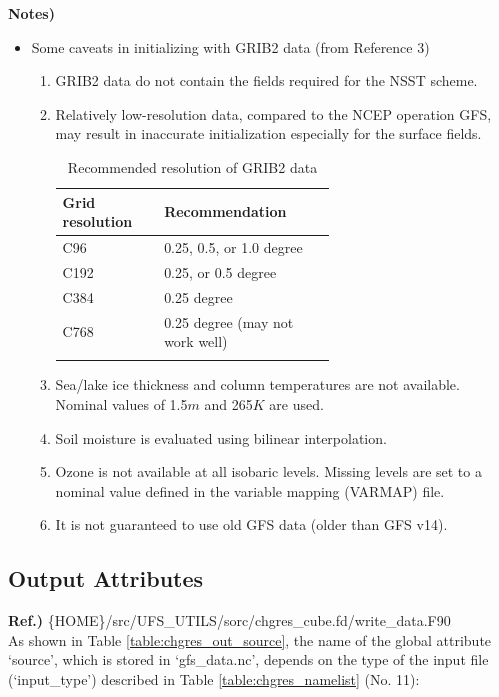 \documentclass[11pt,fleqn]{report}              %
\begin{document}
{\bf Notes)}
\begin{itemize}

\item Some caveats in initializing with GRIB2 data (from Reference 3)

\begin{enumerate}
\item GRIB2 data do not contain the fields required for the NSST scheme.
\item Relatively low-resolution data, compared to the NCEP operation GFS, may result in inaccurate initialization especially for the surface fields.
{
\fontsize{10}{12}\selectfont
\begin{longtable}{p{0.2\linewidth} | p{0.4\linewidth} }
\hline
\hline
Grid resolution & Recommendation \\
\hline
 C96 & 0.25, 0.5, or 1.0 degree \\
 C192 & 0.25, or 0.5 degree \\
 C384 & 0.25 degree \\
 C768 & 0.25 degree (may not work well) \\
\hline
\caption{Recommended resolution of GRIB2 data }
\label{table:chgres_init_grib2_recomm}
\end{longtable}
}

\item Sea/lake ice thickness and column temperatures are not available. Nominal values of 1.5$m$ and 265$K$ are used.
\item Soil moisture is evaluated using bilinear interpolation.
\item Ozone is not available at all isobaric levels. Missing levels are set to a nominal value defined in the variable mapping (VARMAP) file.
\item It is not guaranteed to use old GFS data (older than GFS v14).
\end{enumerate}

\end{itemize}



\subsection{Output Attributes}
\label{subsec:output_attr_chgres_cube}

{\bf Ref.)} \{HOME\}/src/UFS\_UTILS/sorc/chgres\_cube.fd/write\_data.F90 \\

As shown in Table \ref{table:chgres_out_source}, the name of the global attribute `source', which is stored in `gfs\_data.nc', depends on the type of the input file (`input\_type') described in Table \ref{table:chgres_namelist} (No. 11):
\end{document}

